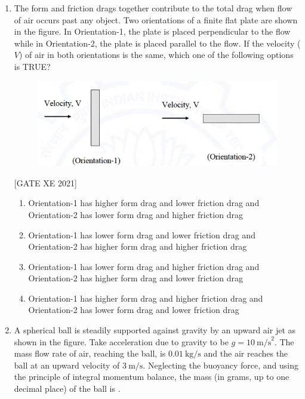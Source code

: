 \documentclass[journal,12pt,onecolumn]{IEEEtran}
\theoremstyle{remark}
\begin{document}
\begin{enumerate}
\vspace{0.8\baselineskip}

\item The form and friction drags together contribute to the total drag when flow of air occurs past any object. Two orientations of a finite flat plate are shown in the figure. In Orientation-1, the plate is placed perpendicular to the flow while in Orientation-2, the plate is placed parallel to the flow. If the velocity ($V$) of air in both orientations is the same, which one of the following options is TRUE?
\begin{figure}[H]
      \centering
      \includegraphics[width=0.6\columnwidth]{figs/fig7.png}
      \caption{}
      \label{fig:placeholder}
  \end{figure}

\hfill[GATE XE 2021]



\begin{enumerate}
\item Orientation-1 has higher form drag and lower friction drag and Orientation-2 has lower form drag and higher friction drag
\item Orientation-1 has lower form drag and lower friction drag and Orientation-2 has higher form drag and higher friction drag
\item Orientation-1 has lower form drag and higher friction drag and Orientation-2 has higher form drag and lower friction drag
\item Orientation-1 has higher form drag and higher friction drag and Orientation-2 has lower form drag and lower friction drag
\end{enumerate}


\item A spherical ball is steadily supported against gravity by an upward air jet as shown in the figure. Take acceleration due to gravity to be $g=10\ \text{m/s}^2$. The mass flow rate of air, reaching the ball, is $0.01\ \text{kg/s}$ and the air reaches the ball at an upward velocity of $3\ \text{m/s}$. Neglecting the buoyancy force, and using the principle of integral momentum balance, the mass (in grams, up to one decimal place) of the ball is \underline{\hspace{2cm}}.


\end{enumerate}
\end{document}
